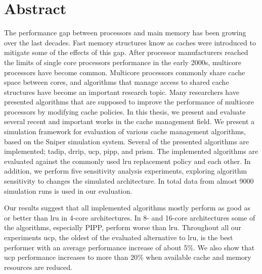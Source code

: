 
\section*{Abstract}

The performance gap between processors and main memory has been growing over the last decades.
Fast memory structures know as caches were introduced to mitigate some of the effects of this gap.
After processor manufacturers reached the limits of single core processors performance in the early 2000s, multicore processors have become common.
Multicore processors commonly share cache space between cores, and algorithms that manage access to shared cache structures have become an important research topic.
Many researchers have presented algorithms that are supposed to improve the performance of multicore processors by modifying cache policies.
In this thesis, we present and evaluate several recent and important works in the cache management field.
We present a simulation framework for evaluation of various cache management algorithms, based on the Sniper simulation system.
Several of the presented algorithms are implemented;  \gls{tadip}, \gls{drrip}, \gls{ucp}, \gls{pipp}, and \gls{prism}.
The implemented algorithms are evaluated against the commonly used \gls{lru} replacement policy and each other.
In addition, we perform five sensitivity analysis experiments, exploring algorithm sensitivity to changes the simulated architecture.
In total data from almost 9000 simulation runs is used in our evaluation.

Our results suggest that all implemented algorithms mostly perform as good as or better than \gls{lru} in 4-core architectures.
In 8- and 16-core architectures some of the algorithms, especially PIPP, perform worse than \gls{lru}.
Throughout all our experiments \gls{ucp}, the oldest of the evaluated alternative to \gls{lru}, is the best performer with an average performance increase of about 5\%.
We also show that \gls{ucp} performance increases to more than 20\% when available cache and memory resources are reduced.

\glsresetall
\clearpage

